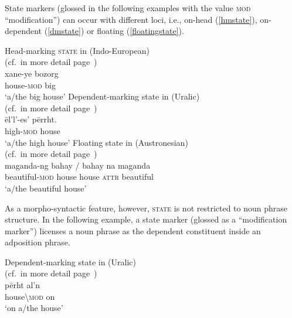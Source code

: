 State markers (glossed in the following examples with the value \textsc{mod} “modification”) can occur with different loci, i.e., on-head (\ref{hmstate}), on-dependent (\ref{dmstate}) or floating (\ref{floatingstate}).
\begin{exe}
\ex
\begin{xlist}
\ex
\label{hmstate} 
{\rm Head-marking \textsc{state} in  (Indo-European)}\\{\rm (cf.~in more detail page~\pageref{persian constr state})}\\
\gll xane-ye bozorg\\
	house-\textsc{mod} big\\
\glt 	‘a/the big house’
\ex
\label{dmstate}
{\rm Dependent\hyp{}marking state in  (Uralic)}\\{\rm (cf.~in more detail page~\pageref{kildin attr.adj.sg})}\\
\gll 	ēl'l'-es' 		pērrht.\\
	high-\textsc{mod}	house\\
\glt	‘a/the high house’
\ex
\label{floatingstate}
{\rm Floating state in  (Austronesian)}\\{\rm (cf.~in more detail page~\pageref{tagalog linker})}\\
\gll maganda-ng bahay / bahay na maganda\\
	beautiful-\textsc{mod} house {} house \textsc{attr} beautiful\\
\glt	‘a/the beautiful house’
\end{xlist}
\end{exe}
As a morpho-syntactic feature, however, \textsc{state} is not restricted to noun phrase structure. In the following example, a state marker (glossed as a “modification marker”) licenses a noun phrase as the dependent constituent inside an adposition phrase.
\begin{exe}
\ex
{\rm Dependent\hyp{}marking state in  (Uralic)}\\{\rm (cf.~in more detail page~\pageref{state ap kildin})}\\
\gll 	pērht		al'n\\
	house\textbackslash\textsc{mod}	on\\
\glt 	‘on a/the house’
\end{exe}

